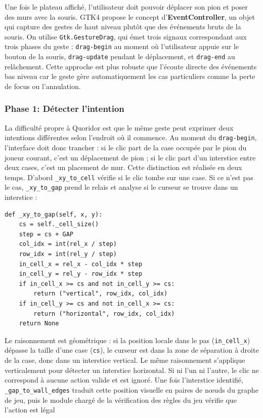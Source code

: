 \documentclass[a4paper]{article}
\begin{document}
Une fois le plateau affiché, l'utilisateur doit pouvoir déplacer son
pion et poser des murs avec la souris. GTK4 propose le concept
d'\textbf{EventController}, un objet qui capture des gestes de haut
niveau plutôt que des événements bruts de la souris. On utilise
\texttt{Gtk.GestureDrag}, qui émet trois signaux correspondant aux
trois phases du geste : \texttt{drag-begin} au moment où l'utilisateur
appuie sur le bouton de la souris, \texttt{drag-update} pendant le
déplacement, et \texttt{drag-end} au relâchement. Cette approche est
plus robuste que l'écoute directe des événements bas niveau car le
geste gère automatiquement les cas particuliers comme la perte de
focus ou l'annulation.

\subsubsection*{Phase 1: Détecter l'intention}

La difficulté propre à Quoridor est que le même geste peut exprimer
deux intentions différentes selon l'endroit où il commence. Au moment
du \texttt{drag-begin}, l'interface doit donc trancher : si le clic
part de la case occupée par le pion du joueur courant, c'est un
déplacement de pion ; si le clic part d'un interstice entre deux
cases, c'est un placement de mur. Cette distinction est réalisée en
deux temps. D'abord \texttt{\_xy\_to\_cell} vérifie si le clic tombe
sur une case. Si ce n'est pas le cas, \texttt{\_xy\_to\_gap} prend le
relais et analyse si le curseur se trouve dans un interstice :

\begin{lstlisting}[caption={Détection d'un interstice entre deux cases}]
def _xy_to_gap(self, x, y):
    cs = self._cell_size()
    step = cs + GAP
    col_idx = int(rel_x / step)
    row_idx = int(rel_y / step)
    in_cell_x = rel_x - col_idx * step
    in_cell_y = rel_y - row_idx * step
    if in_cell_x >= cs and not in_cell_y >= cs:
        return ("vertical", row_idx, col_idx)
    if in_cell_y >= cs and not in_cell_x >= cs:
        return ("horizontal", row_idx, col_idx)
    return None
\end{lstlisting}

Le raisonnement est géométrique : si la position locale dans le pas
(\texttt{in\_cell\_x}) dépasse la taille d'une case (\texttt{cs}),
le curseur est dans la zone de séparation à droite de la case, donc
dans un interstice vertical. Le même raisonnement s'applique
verticalement pour détecter un interstice horizontal. Si ni l'un ni
l'autre, le clic ne correspond à aucune action valide et est ignoré.
Une fois l'interstice identifié, \texttt{\_gap\_to\_wall\_edges}
traduit cette position visuelle en paires de nœuds du graphe de jeu,
puis le module chargé de la vérification des règles du jeu vérifie que l'action est légal
\end{document}
